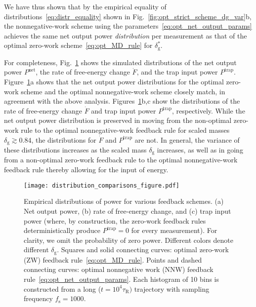 \documentclass[%
reprint,
bibnotes, amsmath, amssymb, aps, pre,
 showkeys,
floatfix
]{revtex4-2}
\newcommand{\mrm}{\mathrm}
\newcommand{\trelo}{\tau_{\mrm{R}}}
\newcommand{\dg}{\delta_{\mrm{g}}}
\newcommand{\fs}{f_{\mrm{s}}}
\newcommand{\pt}{P^{\mrm{trap}}}
\newcommand{\pg}{\dot{F}}
\newcommand{\pn}{P^{\mrm{net}}}
\begin{document}
{We have thus shown that by the empirical equality of distributions~\eqref{eq:distr_equality} shown in Fig.~\ref{fig:opt_strict_scheme_dg_var}b, the nonnegative-work scheme using the parameters~\eqref{eq:opt_net_output_params} achieves the same net output power \emph{distribution} per measurement as that of the optimal zero-work scheme~\eqref{eq:opt_MD_rule} for $\dg^{*}$.

For completeness, Fig.~\ref{fig:work_distributions} shows the simulated distributions of the net output power $\pn$, the rate of free-energy change $\pg$, and the trap input power $\pt$.
Figure~\ref{fig:work_distributions}a shows that the net output power distributions for the optimal zero-work scheme and the optimal nonnegative-work scheme closely match, in agreement with the above analysis. 
Figures~\ref{fig:work_distributions}b,c show the distributions of the rate of free-energy change $\pg$ and trap input power $\pt$, respectively.
While the net output power distribution is preserved in moving from the non-optimal zero-work rule to the optimal nonnegative-work feedback rule for scaled masses $\dg \gtrsim 0.84$, 
the distributions for $\pg$ and $\pt$ are not.
In general, the variance of these distributions increases as the scaled mass $\dg$ increases, as well as in going from a non-optimal zero-work feedback rule to the 
optimal nonnegative-work feedback rule thereby allowing for the input of energy.

\begin{figure}
    \centering
    \texttt{[image: distribution\_comparisons\_figure.pdf]}
    \caption{\color{black} Empirical distributions of power for various feedback schemes.   
    (a) Net output power, (b) rate of free-energy change, and (c) trap input power
    (where, by construction, the zero-work feedback rules deterministically produce $\pt = 0$ for every measurement). 
    For clarity, we omit the probability of zero power. 
    Different colors denote different $\dg$. Squares and solid connecting curves: optimal zero-work (ZW) feedback rule~\eqref{eq:opt_MD_rule}. 
    Points and dashed connecting curves: optimal nonnegative work (NNW) feedback rule~\eqref{eq:opt_net_output_params}. 
    Each histogram of 10 bins is constructed from a long ($t = 10^{4}\trelo)$ trajectory with sampling frequency $\fs = 1000$. 
    }
    \label{fig:work_distributions}
\end{figure}

}


\FloatBarrier
\newpage
\end{document}
